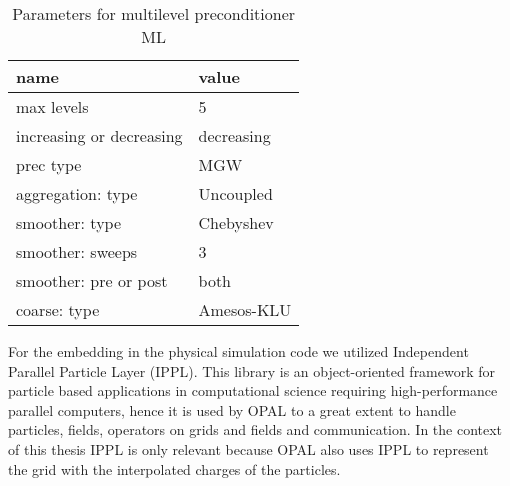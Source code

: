 \begin{table}[h!b!p!]
  \begin{center}
    \begin{tabular}{l|l}
      \hline
      name & value \\
      \hline
      \hline
      max levels & 5 \\
      increasing or decreasing & decreasing \\
      prec type & MGW \\
      aggregation: type & Uncoupled \\
      smoother: type & Chebyshev \\
      smoother: sweeps & 3 \\
      smoother: pre or post & both \\
      coarse: type & Amesos-KLU \\
      \hline
    \end{tabular}
    \caption{Parameters for multilevel
      preconditioner ML}
    \label{tab:sa_setup}
  \end{center}
\end{table}

For the embedding in the physical simulation code we utilized
Independent Parallel Particle Layer (IPPL).  This library is an
object-oriented framework for particle based applications in
computational science requiring high-performance parallel computers,
hence it is used by \textsc{OPAL} to a great extent to handle particles,
fields, operators on grids and fields and communication.  In the context
of this thesis IPPL is only relevant because \textsc{OPAL} also uses
IPPL to represent the grid with the interpolated charges of the
particles.




